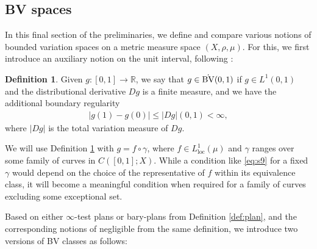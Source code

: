 \documentclass[11pt]{amsart}
\theoremstyle{definition}
\newtheorem{definition}[theorem]{Definition}
\theoremstyle{remark}
\numberwithin{equation}{section}
\newcommand{\abs}[1]{|#1|}
\begin{document}
\subsection{BV spaces}\label{ss:BV}

In this final section of the preliminaries, we define and compare various notions of bounded
variation spaces on a metric measure space $(X,\rho,\mu)$. For this, we first introduce an
auxiliary notion on the unit interval, following \cite[(5.14)]{AD:14}:

\begin{definition}\label{def:BVunit}
Given $g:[0,1]\to\mathbb R$, we say that $g\in \dot{\rm BV}(0,1)$ if $g\in L^1(0,1)$ and the
distributional derivative $Dg$ is a finite measure, and we have the additional boundary
regularity
\begin{align}\label{eq:s9}
|g(1)-g(0)|\le |Dg|(0,1)<\infty,
\end{align}
where $\abs{Dg}$ is the total variation measure of $Dg$.
\end{definition}

We will use Definition \ref{def:BVunit} with $g=f\circ\gamma$, where $f\in
L^1_{\mathrm{loc}}(\mu)$ and $\gamma$ ranges over some family of curves in $C([0,1];X)$.
While a condition like \eqref{eq:s9} for a fixed $\gamma$ would depend on the choice of the
representative of $f$ within its equivalence class, it will become a meaningful condition
when required for a family of curves excluding some exceptional set.

Based on either $\infty$-test plans or bary-plans from Definition \ref{def:plan}, and the
corresponding notions of negligible from the same definition, we introduce two versions of
BV classes as follows:
\end{document}
